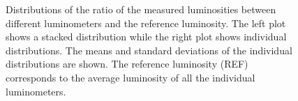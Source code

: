 	

\begin{figure}[!htb]
	\centering
	\caption{Distributions of the ratio of the measured luminosities between different luminometers and the reference luminosity. The left plot shows a stacked distribution while the right plot shows individual distributions. The means and standard deviations of the individual distributions are shown. The reference luminosity (REF) corresponds to the average luminosity of all the individual luminometers.}
	\label{fig:vdm_ratio_histograms}
\end{figure}



